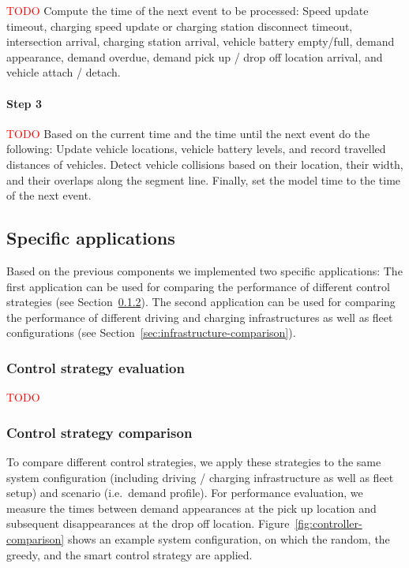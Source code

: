 \documentclass[a4paper,twoside]{article}
\begin{document}
	\textcolor{red}{TODO}
	Compute the time of the next event to be processed:
	Speed update timeout,
	charging speed update or charging station disconnect timeout,
	intersection arrival,
	charging station arrival,
	vehicle battery empty/full,
	demand appearance,
	demand overdue,
	demand pick up / drop off location arrival, and
	vehicle attach / detach.
	
	\paragraph{Step 3}
	
	\textcolor{red}{TODO}
	Based on the current time and the time until the next event do the following:
	Update vehicle locations, vehicle battery levels, and record travelled distances of vehicles.
	Detect vehicle collisions based on their location, their width, and their overlaps along the segment line.
	Finally, set the model time to the time of the next event.
	
	\subsection{Specific applications}
	\label{sec:application}
	
	Based on the previous components we implemented two specific applications:
	The first application can be used for comparing the performance of different control strategies (see Section~\ref{sec:controller-comparison}).
	The second application can be used for comparing the performance of different driving and charging infrastructures as well as fleet configurations (see Section~\ref{sec:infrastructure-comparison}).

	\subsubsection{Control strategy evaluation}
	\label{sec:controller-evaluation}

	\textcolor{red}{TODO}
	
	\subsubsection{Control strategy comparison}
	\label{sec:controller-comparison}
	
	To compare different control strategies, we apply these strategies to the same system configuration (including driving / charging infrastructure as well as fleet setup) and scenario (i.e.\ demand profile).
	For performance evaluation, we measure the times between demand appearances at the pick up location and subsequent disappearances at the drop off location.
	Figure~\ref{fig:controller-comparison} shows an example system configuration, on which the random, the greedy, and the smart control strategy are applied.
	
\end{document}
